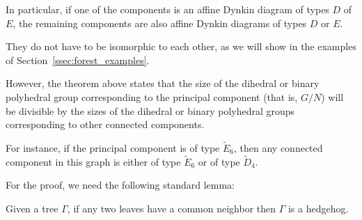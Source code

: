 \documentclass[ALCO]{cedram}
\begin{document}
\begin{rema}
 In particular, if one of the components is an affine Dynkin diagram of types $D$ of $E$, the remaining components are also affine Dynkin diagrams of types $D$ or $E$.
 
 They do not have to be isomorphic to each other, as we will show in {the examples of Section~\ref{ssec:forest_examples}}.
 
 However, the theorem above states that the size of the dihedral or binary polyhedral group corresponding to the principal component (that is, $G/N$) will be divisible by the sizes of the dihedral or binary polyhedral groups corresponding to other connected components. 
 
 For instance, if the principal component is of type $\widetilde{E}_6$, then {any connected component in this graph is either of type} $\widetilde{E}_6$ or {of type} $\widetilde{D}_4$.
  
\end{rema}
{
For the proof, we need the following standard lemma:
\begin{lemma}\label{lem:graph_aux}
Given a tree $\Gamma$, if {any two leaves have a common neighbor} then $\Gamma$ is a hedgehog.  
\end{lemma}
}
\end{document}
